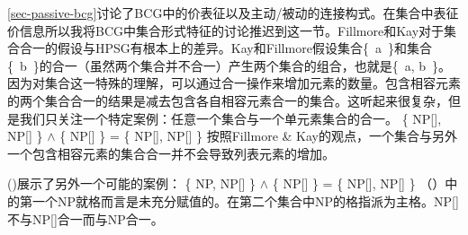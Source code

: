 \ref{sec-passive-bcg}讨论了BCG中的价表征以及主动/被动的连接构式。在集合中表征价信息所以我将BCG中集合形式特征的讨论推迟到这一节。Fillmore和Kay对于集合合一的假设与HPSG有根本上的差异。Kay和Fillmore假设集合\{~a~\}和集合\mbox{\{ b \}}的合一（虽然两个集合并不合一）产生两个集合的组合，也就是\{~a, b~\}。因为对集合这一特殊的理解，可以通过合一操作来增加元素的数量。包含相容元素的两个集合合一的结果是减去包含各自相容元素合一的集合。这听起来很复杂，但是我们只关注一个特定案例：任意一个集合与一个单元素集合的合一。
\ea
\{ NP[], NP[] \} $\wedge$ \{ NP[] \} = \{ NP[], NP[] \}
\z
按照Fillmore \& Kay的观点，一个集合与另外一个包含相容元素的集合合一并不会导致列表元素的增加。

\noindent
()展示了另外一个可能的案例：
\ea
\{ NP, NP[] \} $\wedge$ \{ NP[] \} = \{ NP[], NP[] \}
\z
（）中的第一个NP就格而言是未充分赋值的。在第二个集合中NP的格指派为主格。NP[]不与NP[]合一而与NP合一。


